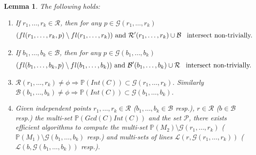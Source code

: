 \documentclass[12pt]{caltech_thesis}
\theoremstyle{plain}
\newtheorem{lemma}{Lemma}
\theoremstyle{definition}
\newcommand{\MB}{\mathcal{B}}
\newcommand{\ML}{\mathcal{L}}
\newcommand{\MP}{\mathcal{P}}
\newcommand{\MR}{\mathcal{R}}
\newcommand{\MG}{\mathcal{G}}
\newcommand{\PP}{\mathbb{P}}
\begin{document}
 
 \begin{lemma}\label{lemma:otherpartproof}
 The following holds:
 \begin{enumerate}
  \item If $r_1,\ldots,r_k\in \MR$, then for any $p\in \MG(r_1,\ldots,r_k)$   
  \[
  (fl(r_1,\ldots,r_k,p)\setminus fl(r_1,\ldots,r_k)) \text{ and } \MR^\prime(r_1,\ldots,r_k)\cup \MB \hspace{0.5em}\text{ intersect non-trivially.}                                     
 \]

 \item If $b_1,\ldots,b_k\in \MB$, then for any $p\in \MG(b_1,\ldots,b_k)$
  \[
  (fl(b_1,\ldots,b_k,p)\setminus fl(b_1,\ldots,b_k)) \text{ and } \MB^\prime(b_1,\ldots,b_k)\cup \MR \hspace{0.5em}\text{ intersect non-trivially.}
 \]
 \item $\MR(r_1,\ldots,r_k) \neq\phi \Rightarrow \PP(Int(C)) \subset \MG(r_1,\ldots,r_k)$. Similarly 
 $\MB(b_1,\ldots,b_k) \neq\phi \Rightarrow \PP(Int(C))\subset \MG(b_1,\ldots,b_k)$.
 
 \item Given independent points $r_1,\ldots,r_k \in \MR$ ($b_1,\ldots,b_k \in \MB$ resp.), $r\in \MR$ ($b\in \MB$ resp.)
 the multi-set $\PP(Gcd(C)Int(C))$ and the set $\MP$,
 there exists efficient algorithms to compute the multi-set $\PP(M_2)\setminus \MG(r_1,\ldots,r_k)$ 
 ($\PP(M_1)\setminus \MG(b_1,\ldots,b_k)$ resp.) and multi-sets of lines 
 $\ML(r,\MG(r_1,\ldots,r_k))$ ($\ML(b,\MG(b_1,\ldots,b_k))$ resp.).
 \end{enumerate}
 \end{lemma}
 
\end{document}
